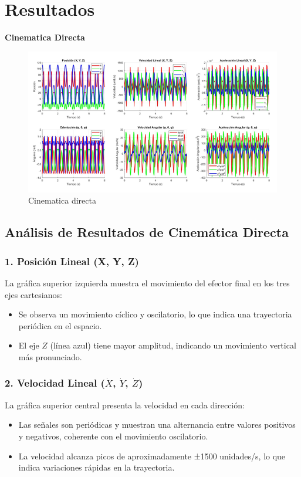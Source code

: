 \chapter{Resultados} \label{chap:resultados}
\textbf{Cinematica Directa}
\begin{figure} [h]
	\centering
	\includegraphics[width=0.7\linewidth]{img/cinematicadirecta}
	\caption{Cinematica directa}
	\label{fig:cinematicadirecta}
\end{figure}

\section*{Análisis de Resultados de Cinemática Directa}


\subsection*{1. Posición Lineal (X, Y, Z)}
La gráfica superior izquierda muestra el movimiento del efector final en los tres ejes cartesianos:


\begin{itemize}
	\item Se observa un movimiento cíclico y oscilatorio, lo que indica una trayectoria periódica en el espacio.
	\item El eje $Z$ (línea azul) tiene mayor amplitud, indicando un movimiento vertical más pronunciado.
\end{itemize}


\subsection*{2. Velocidad Lineal ($\dot{X}$, $\dot{Y}$, $\dot{Z}$)} La gráfica superior central presenta la velocidad en cada dirección:

\begin{itemize}
	\item Las señales son periódicas y muestran una alternancia entre valores positivos y negativos, coherente con el movimiento oscilatorio.
	\item La velocidad alcanza picos de aproximadamente ±1500 unidades/s, lo que indica variaciones rápidas en la trayectoria.
\end{itemize}


